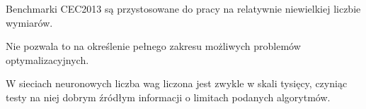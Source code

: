 Benchmarki CEC2013 są przystosowane do pracy na relatywnie niewielkiej liczbie wymiarów. 

Nie pozwala to na określenie pełnego zakresu możliwych problemów optymalizacyjnych.

W sieciach neuronowych liczba wag liczona jest zwykle w skali tysięcy, czyniąc testy na niej dobrym źródłym informacji o limitach podanych algorytmów.

